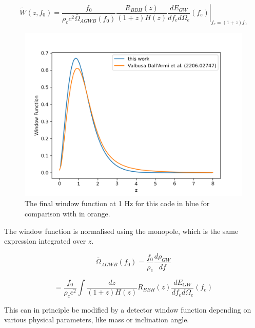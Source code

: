 \begin{equation}
\label{window}
    \tilde{W}(z, f_0)=\frac{f_0}{\rho_c c^2 \bar{\Omega}_{AGWB}(f_0)}
    \frac{R_{BBH}(z)}{(1+z)H(z)} \left. \frac{dE_{GW}}{df_e d\Omega_e}(f_e)\right|_{f_e=(1+z)f_0}
\end{equation}

\begin{figure}
    \centering
    \includegraphics[width=0.8\linewidth]{Images/window_comparison.png}
    \caption[The final window function at 1 Hz for this code for comparison with \cite{dallarmi_dipole_2022}.]{The final window function at 1 Hz for this code in blue for comparison with \cite{dallarmi_dipole_2022} in orange.}
    \label{window_comparison}
\end{figure} 

The window function is normalised using the monopole, which is the same expression integrated over $z$.

\begin{equation}
    \bar{\Omega}_{AGWB}(f_0)= \frac{f_0}{\rho_c}\frac{d\rho_{GW}}{df}
\end{equation}

\begin{equation}
    = \frac{f_0}{\rho_c c^2 } \int \frac{dz}{(1+z)H(z)} R_{BBH}(z) \frac{dE_{GW}}{df_e d\Omega_e}(f_e)
\end{equation}

This can in principle be modified by a detector window function depending on various physical parameters, like mass or inclination angle.


